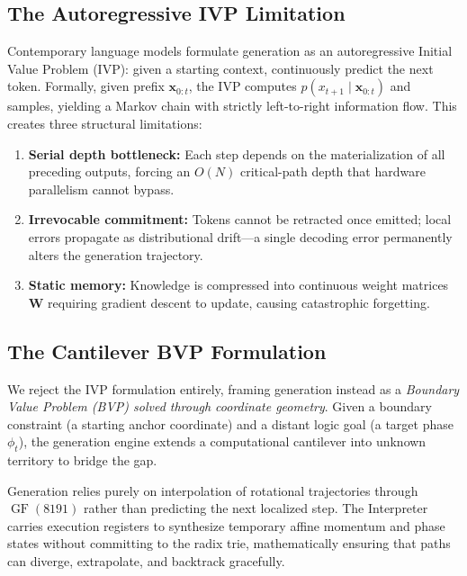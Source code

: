 \subsection{The Autoregressive IVP Limitation}
\label{sec:ivp_limitation}

Contemporary language models formulate generation as an autoregressive Initial Value Problem (IVP): given a starting context, continuously predict the next token. Formally, given prefix $\mathbf{x}_{0:t}$, the IVP computes $p(x_{t+1} \mid \mathbf{x}_{0:t})$ and samples, yielding a Markov chain with strictly left-to-right information flow. This creates three structural limitations:

\begin{enumerate}[nosep]
  \item \textbf{Serial depth bottleneck:} Each step depends on the materialization of all preceding outputs, forcing an $O(N)$ critical-path depth that hardware parallelism cannot bypass.
  \item \textbf{Irrevocable commitment:} Tokens cannot be retracted once emitted; local errors propagate as distributional drift---a single decoding error permanently alters the generation trajectory.
  \item \textbf{Static memory:} Knowledge is compressed into continuous weight matrices $\mathbf{W}$ requiring gradient descent to update, causing catastrophic forgetting.
\end{enumerate}

\subsection{The Cantilever BVP Formulation}
\label{sec:cantilever_bvp}

We reject the IVP formulation entirely, framing generation instead as a \emph{Boundary Value Problem (BVP) solved through coordinate geometry}. Given a boundary constraint (a starting anchor coordinate) and a distant logic goal (a target phase $\phi_t$), the generation engine extends a computational cantilever into unknown territory to bridge the gap.

Generation relies purely on interpolation of rotational trajectories through $\operatorname{GF}(8191)$ rather than predicting the next localized step. The Interpreter carries execution registers to synthesize temporary affine momentum and phase states without committing to the radix trie, mathematically ensuring that paths can diverge, extrapolate, and backtrack gracefully.

